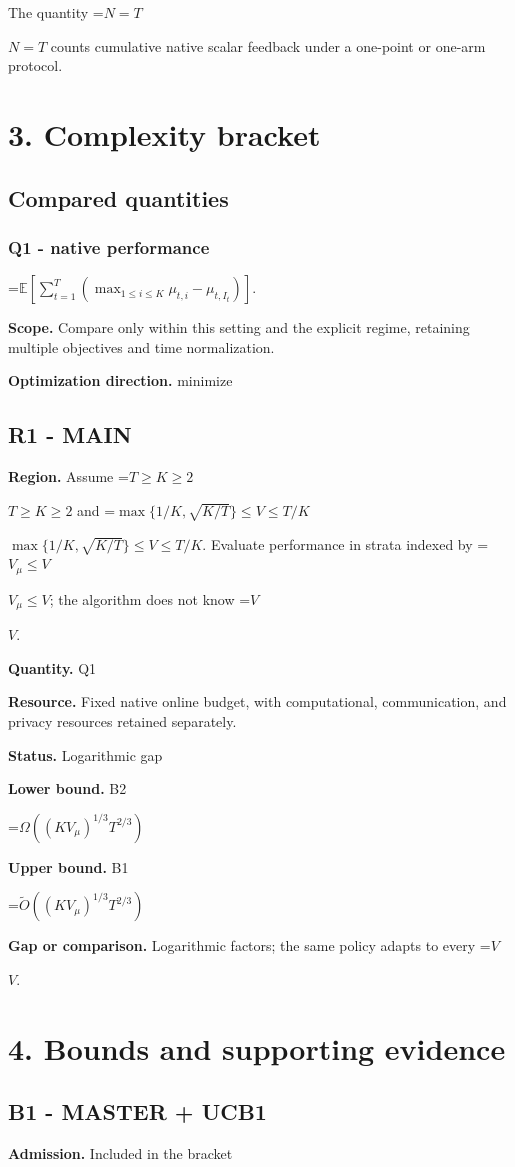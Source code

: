 \documentclass[10pt,a4paper]{article}
\newcommand{\AtlasMath}[1]{\par\begingroup\centering\setbox0=\hbox{$\displaystyle #1$}\ifdim\wd0>1.4\linewidth\typeout{ATLAS WIDE FORMULA: \the\wd0}\fi\ifdim\wd0>\linewidth\resizebox{\linewidth}{!}{\box0}\else\box0\fi\par\endgroup}
\newcommand{\AtlasInlineMath}[1]{\begingroup\setbox0=\hbox{$#1$}\ifdim\wd0>.4\linewidth\endgroup\AtlasMath{#1}\else\endgroup$#1$\fi}
\begin{document}
The quantity \AtlasInlineMath{N=T} counts cumulative native scalar feedback under a one-point or one-arm protocol.

\section{3. Complexity bracket}
\subsection{Compared quantities}
\subsubsection{Q1 - native performance}
\AtlasMath{\mathbb E\!\left[\sum_{t=1}^{T}\left(\max_{1\le i\le K}\mu_{t,i}-\mu_{t,I_t}\right)\right].}
\textbf{Scope.} Compare only within this setting and the explicit regime, retaining multiple objectives and time normalization.

\textbf{Optimization direction.} minimize

\subsection{R1 - MAIN}
\textbf{Region.} Assume \AtlasInlineMath{T\ge K\ge2} and \AtlasInlineMath{\max\{1/K,\sqrt{K/T}\}\le V\le T/K}. Evaluate performance in strata indexed by \AtlasInlineMath{V_\mu\le V}; the algorithm does not know \AtlasInlineMath{V}.

\textbf{Quantity.} Q1

\textbf{Resource.} Fixed native online budget, with computational, communication, and privacy resources retained separately.

\textbf{Status.} Logarithmic gap

\textbf{Lower bound.} B2

\AtlasMath{\Omega((KV_\mu)^{1/3}T^{2/3})}
\textbf{Upper bound.} B1

\AtlasMath{\widetilde{O}((KV_\mu)^{1/3}T^{2/3})}
\textbf{Gap or comparison.} Logarithmic factors; the same policy adapts to every \AtlasInlineMath{V}.

\section{4. Bounds and supporting evidence}
\subsection{B1 - MASTER + UCB1}
\textbf{Admission.} Included in the bracket
\end{document}
